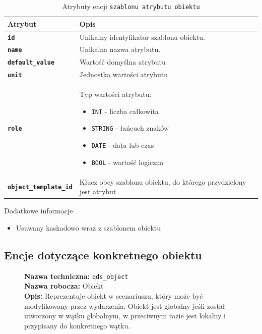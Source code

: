 \begin{table}[H]
    \centering
    \renewcommand{\arraystretch}{1.6}
    \begin{tabular}{|>{\bfseries}l|p{}|}
        \hline
        \rowcolor[HTML]{EFEFEF} \textbf{Atrybut} & \textbf{Opis} \\
        \hline
        \texttt{id} & Unikalny identyfikator szablonu obiektu. \\
        \hline
        \texttt{name} & Unikalna nazwa atrybutu. \\
        \hline
        \texttt{default\_value} & Wartość domyślna atrybutu \\
        \hline
        \texttt{unit} & Jednostka wartości atrybutu \\
        \hline
        \texttt{role} & Typ wartości atrybutu:
        \begin{itemize}
            \item \texttt{INT} - liczba całkowita
            \item \texttt{STRING} - łańcuch znaków
            \item \texttt{DATE} - data lub czas
            \item \texttt{BOOL} - wartość logiczna
        \end{itemize} \\
        \hline
        \texttt{object\_template\_id} & Klucz obcy szablonu obiektu, do którego przydzielony jest atrybut \\
        \hline
    \end{tabular}
    \caption{Atrybuty encji \texttt{szablonu atrybutu obiektu}}
\end{table}

Dodatkowe informacje
\begin{itemize}
    \item Usuwany kaskadowo wraz z szablonem obiektu
\end{itemize}

\subsection{Encje dotyczące konkretnego obiektu}

\begin{figure}[H]
    \centering
    \begin{minipage}{0.8\textwidth}
        \begin{framed}
            \noindent\textbf{\large Nazwa techniczna:} \texttt{qds\_object} \\
            \textbf{\large Nazwa robocza:} Obiekt \\
            \textbf{\large Opis:} Reprezentuje obiekt w scenariuszu, który może być modyfikowany przez wydarzenia.
            Obiekt jest globalny jeśli został utworzony w wątku globalnym, w przeciwnym razie jest lokalny
            i przypisany do konkretnego wątku.
        \end{framed}
    \end{minipage}
\end{figure}

